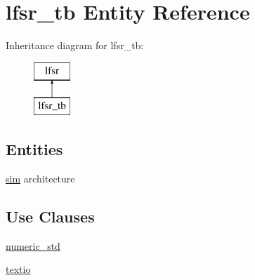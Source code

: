 \hypertarget{classlfsr__tb}{\section{lfsr\-\_\-tb Entity Reference}
\label{classlfsr__tb}
}
Inheritance diagram for lfsr\-\_\-tb\-:\begin{figure}[H]
\begin{center}
\leavevmode
\includegraphics[height=2.000000cm]{classlfsr__tb}
\end{center}
\end{figure}
\subsection*{Entities}
\begin{DoxyCompactItemize}
\item 
\hyperlink{classlfsr__tb_1_1sim}{sim} architecture
\end{DoxyCompactItemize}
\subsection*{Use Clauses}
 \begin{DoxyCompactItemize}
\item 
\hypertarget{classlfsr__tb_a2edc34402b573437d5f25fa90ba4013e}{\hyperlink{classlfsr__tb_a2edc34402b573437d5f25fa90ba4013e}{numeric\-\_\-std}   }\label{classlfsr__tb_a2edc34402b573437d5f25fa90ba4013e}

\item 
\hypertarget{classlfsr__tb_aa8c4e25998323a84db5b1fa701b92fcb}{\hyperlink{classlfsr__tb_aa8c4e25998323a84db5b1fa701b92fcb}{textio}   }\label{classlfsr__tb_aa8c4e25998323a84db5b1fa701b92fcb}

\end{DoxyCompactItemize}
